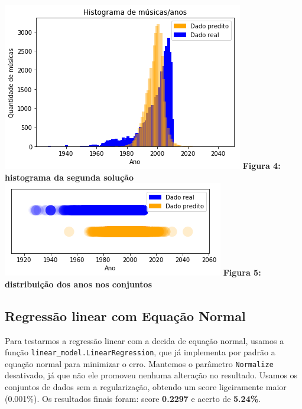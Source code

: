 \documentclass[conference]{IEEEtran}
\begin{document}
\begin{center}
\includegraphics[scale=0.6]{plot3}
\textbf{Figura 4: histograma da segunda solução}
\\
\includegraphics[scale=0.6]{plot4}
\textbf{Figura 5: distribuição dos anos nos conjuntos}

\end{center}

\subsection{Regressão linear com Equação Normal}
Para testarmos a regressão linear com a decida de equação normal,  usamos a função \texttt{linear\_model.LinearRegression}, que já implementa por padrão a equação normal para minimizar o erro. Mantemos o parâmetro \texttt{Normalize} desativado, já que não ele promoveu nenhuma alteração no resultado. Usamos os conjuntos de dados sem a regularização, obtendo um score ligeiramente maior (0.001\%). Os resultados finais foram: score  \textbf{0.2297} e acerto de \textbf{5.24\%}.
\end{document}

